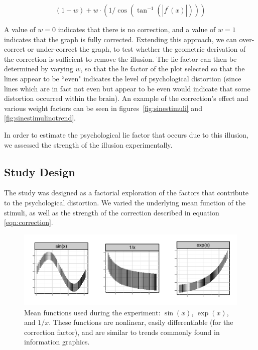 \documentclass[11pt]{isuthesis}\usepackage[]{graphicx}\usepackage[]{color}
\begin{document}
\begin{equation}\label{eqn:correction}
(1-w) + w \cdot \left(1 / \cos\left(\tan^{-1}(|f^\prime(x)|)\right)\right)
\end{equation}

A value of $w=0$ indicates that there is no correction, and a value of $w=1$ indicates that the graph is fully corrected.
Extending this approach, we can over-correct or under-correct the graph, to test whether the geometric derivation of the correction is sufficient to remove the illusion. The lie factor can then be determined by varying $w$, so that the lie factor of the plot selected so that the lines appear to be ``even" indicates the level of psychological distortion (since lines which are in fact not even but appear to be even would indicate that some distortion occurred within the brain). An example of the correction's effect and various weight factors can be seen in figures~\ref{fig:sinestimuli} and \ref{fig:sinestimulinotrend}. 


In order to estimate the psychological lie factor that occurs due to this illusion, we assessed the strength of the illusion experimentally. 

\subsection{Study Design}
The study was designed as a factorial exploration of the factors that contribute to the psychological distortion. We varied the underlying mean function of the stimuli, as well as the strength of the correction described in equation \ref{eqn:correction}.


\begin{figure}
\centering
\includegraphics[width=.8\linewidth]{fig-exampleUncorrected}
\caption[Mean functions used in the experiment]{Mean functions used during the experiment: $\sin(x)$, $\exp(x)$, and $1/x$. These functions are nonlinear, easily differentiable (for the correction factor), and are similar to trends commonly found in information graphics.\label{fig:uncorrectedExamples}}
\end{figure}
\end{document}
